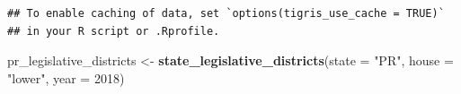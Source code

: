 \documentclass[
]{article}
\newenvironment{Shaded}{\begin{snugshade}}{\end{snugshade}}
\newcommand{\AttributeTok}[1]{\textcolor[rgb]{0.13,0.29,0.53}{#1}}
\newcommand{\DecValTok}[1]{\textcolor[rgb]{0.00,0.00,0.81}{#1}}
\newcommand{\FunctionTok}[1]{\textcolor[rgb]{0.13,0.29,0.53}{\textbf{#1}}}
\newcommand{\NormalTok}[1]{#1}
\newcommand{\OtherTok}[1]{\textcolor[rgb]{0.56,0.35,0.01}{#1}}
\newcommand{\StringTok}[1]{\textcolor[rgb]{0.31,0.60,0.02}{#1}}
\begin{document}
\begin{verbatim}
## To enable caching of data, set `options(tigris_use_cache = TRUE)`
## in your R script or .Rprofile.
\end{verbatim}

\begin{Shaded}
\begin{Highlighting}[]
\NormalTok{pr\_legislative\_districts }\OtherTok{\textless{}{-}} \FunctionTok{state\_legislative\_districts}\NormalTok{(}\AttributeTok{state =} \StringTok{"PR"}\NormalTok{, }\AttributeTok{house =} \StringTok{"lower"}\NormalTok{, }\AttributeTok{year =} \DecValTok{2018}\NormalTok{)}
\end{Highlighting}
\end{Shaded}

\begin{verbatim}

\end{verbatim}
\end{document}
